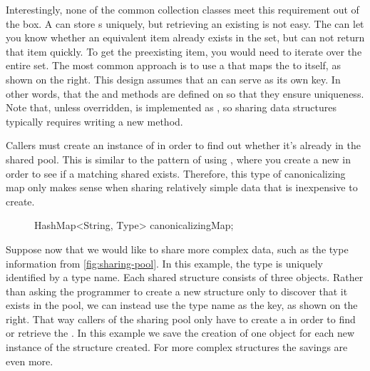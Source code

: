 Interestingly, none of the common collection classes meet this requirement
out of the box. A  can store s uniquely, but
retrieving an existing  is not easy. The 
can let you know whether an equivalent item already
exists in the set, but can not return that item quickly. To get the
preexisting item, you would need to iterate over the entire set. The
most common approach is to use a
 that maps the  to itself, as shown on the
right. This design assumes that an  can serve as its own key.
In other words, that the  and  methods are
defined on  so that they ensure uniqueness. Note that, unless overridden,  is
implemented as \code{==}, so sharing data structures typically requires writing
a new  method.  

Callers must create an instance of  in order
to find out whether it's already in the shared pool. This
is similar to the pattern of using , where you create a new
 in order to see if a matching shared  exists. Therefore, this type
of canonicalizing map only makes sense when sharing relatively simple data
that is inexpensive to create.

\begin{figure}
\centering
\begin{framedlisting}
HashMap<String, Type> canonicalizingMap;
\end{framedlisting}
\end{figure}

Suppose now that we would like to share more complex data, such as the type
information from \autoref{fig:sharing-pool}. In this example, the type is
uniquely identified by a  type name. Each shared structure
consists of three objects. Rather than asking the programmer to create a new  structure only to discover
that it exists in the pool, we can instead use the type name as the key, as
shown on the right. That way callers of the sharing pool only have to create a
 in order to find or retrieve the . In this example we save the creation of
one object for each new instance of the structure created.  For more complex structures the savings
are even more. 




